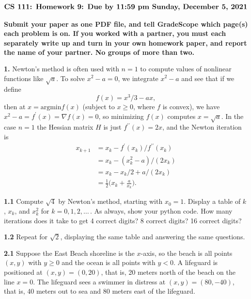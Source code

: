 \documentclass[11pt]{article}
\begin{document}
$$\mbox{\Large \bf CS 111: Homework 9: Due by 11:59 pm Sunday, December 5, 2021}$$
\par\smallskip\noindent
{\bf Submit your paper as one PDF file,
and tell GradeScope which page(s) each problem is on.
If you worked with a partner, 
you must each separately write up and turn in your own homework paper, 
and report the name of your partner.
No groups of more than two.
}

\par\bigskip\noindent
{\bf 1.}
Newton's method is often used with $n=1$ to compute 
values of nonlinear functions like $\sqrt a$. 
To solve $x^2-a=0$, we integrate $x^2-a$ and see that if we define
$$f(x) = x^3/3-ax,$$ 
then at $x=\mbox{argmin} f(x)$ (subject to $x\ge 0$, where $f$ is convex), 
we have $x^2-a = f^\prime(x) = \nabla f(x) = 0$,
so minimizing $f(x)$ computes $x=\sqrt a$.
In the case $n=1$ the Hessian matrix $H$ is just $f^{\prime\prime}(x) = 2x$,
and the Newton iteration is
\begin{align}
x_{k+1} &= x_k - f^\prime(x_k)/f^{\prime\prime}(x_k) \\
        &= x_k - (x_k^2-a)/(2x_k) \\
        &= x_k - x_k/2 +a/(2x_k) \\
        &= \frac{1}{2}\Big(x_k + \frac{a}{x_k}\Big).
\end{align}

\par\medskip\noindent
{\bf 1.1} 
Compute $\sqrt 4$ by Newton's method, starting with $x_0=1$.
Display a table of $k$, $x_k$, and $x_k^2$ for $k=0,1,2,\ldots$\,.
As always, show your python code.
How many iterations does it take to get 4 correct digits?
8 correct digits? 16 correct digits?

\par\medskip\noindent
{\bf 1.2} 
Repeat for $\sqrt 2$, 
displaying the same table and answering the same questions.

\par\bigskip\noindent
{\bf 2.1}
Suppose the East Beach shoreline is the $x$-axis, 
so the beach is all points $(x,y)$ with $y\ge 0$ and 
the ocean is all points with $y<0$.
A lifeguard is positioned at $(x,y) = (0,20)$, that is, 
20 meters north of the beach on the line $x=0$.
The lifeguard sees a swimmer in distress at $(x,y)=(80,-40)$,
that is, 40 meters out to sea and 80 meters east of the lifeguard.
\end{document}

